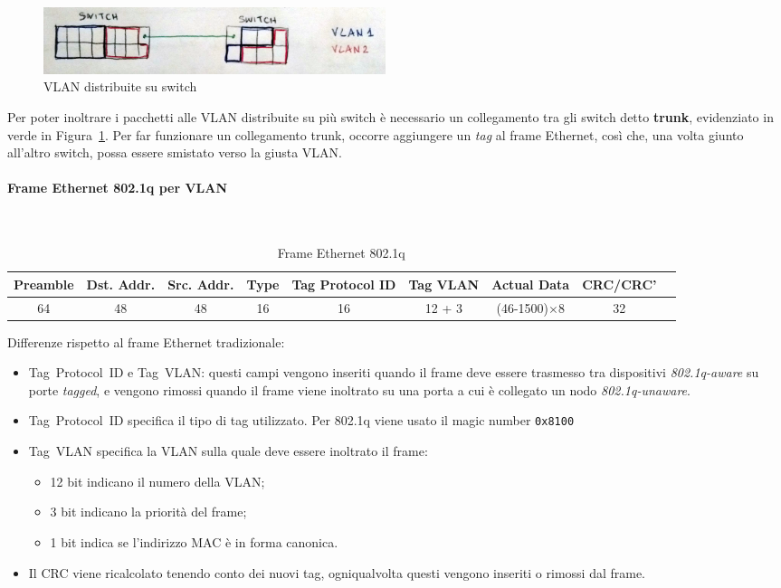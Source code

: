 \documentclass[12pt,a4paper]{article}
\begin{document}
\begin{figure}[H]
  \centering
  \includegraphics[width=10cm]{img/2/vlan-switch.png}
  \caption{VLAN distribuite su switch}
  \label{fig:vlan-switch}
\end{figure}

Per poter inoltrare i pacchetti alle VLAN distribuite su più switch
è necessario un collegamento tra gli switch detto \textbf{trunk},
evidenziato in verde in Figura~\ref{fig:vlan-switch}.
Per far funzionare un collegamento trunk,
occorre aggiungere un \emph{tag} al frame Ethernet, così che, una volta
giunto all'altro switch, possa essere smistato verso la giusta VLAN.

\paragraph{Frame Ethernet 802.1q per VLAN}\mbox{}\\

\begin{table}[H]
  \centering
  \begin{tabular}{| c | c | c | c | c | c | c | c | c |}\hline
  Preamble  & Dst. Addr.  & Src. Addr.  & Type & Tag Protocol ID & Tag VLAN &  Actual Data         & CRC/CRC'  \\ \hline
  64        & 48          & 48          & 16   & 16              & 12 + 3   & (46-1500)$\times$8   & 32        \\ \hline
  \end{tabular}
  \caption{Frame Ethernet 802.1q}
\end{table}

Differenze rispetto al frame Ethernet tradizionale:
\begin{itemize}
  \item Tag~Protocol~ID e Tag~VLAN: questi campi vengono inseriti
    quando il frame deve essere trasmesso tra dispositivi
    \emph{802.1q-aware} su porte \emph{tagged}, e vengono rimossi
    quando il frame viene inoltrato su una porta a cui è collegato
    un nodo \emph{802.1q-unaware}.
  \item Tag~Protocol~ID specifica il tipo di tag utilizzato. Per 802.1q
    viene usato il magic number \texttt{0x8100}
  \item Tag~VLAN specifica la VLAN sulla quale deve essere inoltrato il
    frame:
    \begin{itemize}
      \item 12 bit indicano il numero della VLAN;
      \item 3 bit indicano la priorità del frame;
      \item 1 bit indica se l'indirizzo MAC è in forma canonica.
    \end{itemize}
  \item Il CRC viene ricalcolato tenendo conto dei nuovi tag,
    ogniqualvolta questi vengono inseriti o rimossi dal frame.
\end{itemize}
\end{document}
